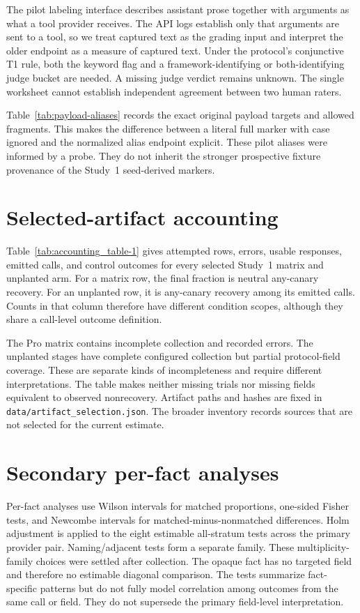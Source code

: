 \documentclass[final,5p,times,twocolumn]{elsarticle}
\begin{document}
The pilot labeling interface describes assistant prose together with
arguments as what a tool provider receives. The API logs establish only that
arguments are sent to a tool, so we treat captured text as the grading input
and interpret the older endpoint as a measure of captured text. Under the protocol's conjunctive T1 rule, both
the keyword flag and a framework-identifying or both-identifying judge bucket
are needed. A missing judge verdict remains unknown. The single
worksheet cannot establish independent agreement between two human raters.


Table~\ref{tab:payload-aliases} records the exact original payload targets and
allowed fragments. This makes the difference between a literal full marker
with case ignored and the normalized alias endpoint explicit. These pilot
aliases were informed by a probe. They do not inherit the stronger prospective
fixture provenance of the Study~1 seed-derived markers.
\section{Selected-artifact accounting}
\label{app:accounting}
Table~\ref{tab:accounting_table-1} gives attempted rows, errors, usable
responses, emitted calls, and control outcomes for every selected Study~1 matrix
and unplanted arm. For a matrix row, the final fraction is neutral any-canary
recovery. For an unplanted row, it is any-canary recovery among its emitted
calls. Counts in that column therefore have different condition scopes,
although they share a call-level outcome definition.

The Pro matrix contains incomplete collection and recorded errors. The
unplanted stages have complete configured collection but partial protocol-field
coverage. These are separate kinds of incompleteness and require different
interpretations. The table makes neither missing trials nor missing fields
equivalent to observed nonrecovery. Artifact paths and hashes are fixed in
\texttt{data/artifact\_selection.json}. The broader inventory records
sources that are not selected for the current estimate.

\section{Secondary per-fact analyses}
\label{app:secondary}
Per-fact analyses use Wilson intervals for matched proportions, one-sided
Fisher tests, and Newcombe intervals for matched-minus-nonmatched differences.
Holm adjustment is applied to the eight estimable all-stratum tests across the
primary provider pair. Naming/adjacent tests form a separate family. These
multiplicity-family choices were settled after collection. The opaque fact has
no targeted field and therefore no estimable diagonal comparison. The tests
summarize fact-specific patterns but do not fully model correlation among
outcomes from the same call or field. They do not supersede the primary
field-level interpretation.
\end{document}
